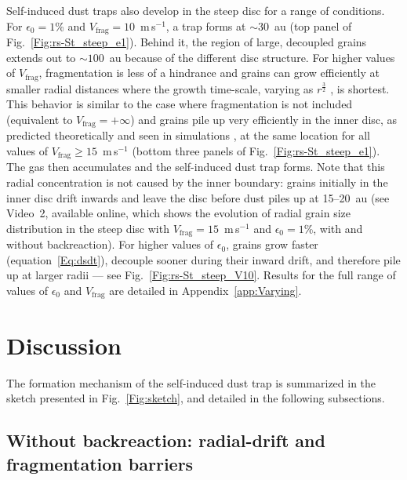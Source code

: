 \documentclass[a4paper,fleqn,usenatbib]{mnras}
\newcommand{\Vfrag}{V_\mathrm{frag}}  %
\begin{document}
Self-induced dust traps also develop in the steep disc for a range of conditions. For $\epsilon_0=1$\% and $\Vfrag=10$~m\,s$^{-1}$, a trap forms at $\sim30$~au (top panel of Fig.~\ref{Fig:rs-St_steep_e1}). Behind it, the region of large, decoupled grains extends out to $\sim100$~au because of the different disc structure. For higher values of $\Vfrag$, fragmentation is less of a hindrance and grains can grow efficiently at smaller radial distances where the growth time-scale, varying as $r^\frac{3}{2}$ \citep{Laibe2008}, is shortest. This behavior is similar to the case where fragmentation is not included (equivalent to $\Vfrag=+\infty$) and grains pile up very efficiently in the inner disc, as predicted theoretically \citep{Laibe2014} and seen in simulations \citep{Gonzalez2015a}, at the same location for all values of $\Vfrag\ge15$~m\,s$^{-1}$ (bottom three panels of Fig.~\ref{Fig:rs-St_steep_e1}). The gas then accumulates and the self-induced dust trap forms. Note that this radial concentration is not caused by the inner boundary: grains initially in the inner disc drift inwards and leave the disc before dust piles up at 15--20~au (see Video~2, available online, which shows the evolution of radial grain size distribution in the steep disc with $\Vfrag=15$~m\,s$^{-1}$ and $\epsilon_0=1$\%, with and without backreaction). For higher values of $\epsilon_0$, grains grow faster (equation~\ref{Eq:dsdt}), decouple sooner during their inward drift, and therefore pile up at larger radii --- see Fig.~\ref{Fig:rs-St_steep_V10}. Results for the full range of values of $\epsilon_0$ and $\Vfrag$ are detailed in Appendix~\ref{app:Varying}.

\section{Discussion}
\label{sec:Discussion}

The formation mechanism of the self-induced dust trap is summarized in the sketch presented in Fig.~\ref{Fig:sketch}, and detailed in the following subsections.

\subsection{Without backreaction: radial-drift and fragmentation barriers}
\label{sec:noBR}
\end{document}
